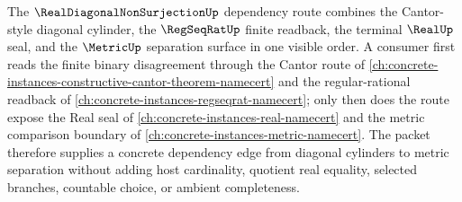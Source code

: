 The $\RealDiagonalNonSurjectionUp$ dependency route combines the Cantor-style diagonal cylinder, the $\RegSeqRatUp$ finite readback, the terminal $\RealUp$ seal, and the $\MetricUp$ separation surface in one visible order. A consumer first reads the finite binary disagreement through the Cantor route of \autoref{ch:concrete-instances-constructive-cantor-theorem-namecert} and the regular-rational readback of \autoref{ch:concrete-instances-regseqrat-namecert}; only then does the route expose the Real seal of \autoref{ch:concrete-instances-real-namecert} and the metric comparison boundary of \autoref{ch:concrete-instances-metric-namecert}. The packet therefore supplies a concrete dependency edge from diagonal cylinders to metric separation without adding host cardinality, quotient real equality, selected branches, countable choice, or ambient completeness.
